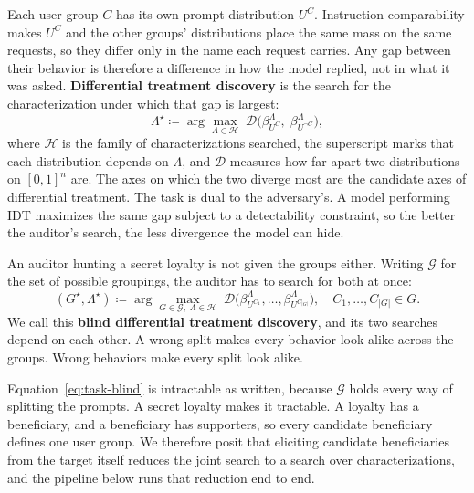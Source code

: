 Each user group $C$ has its own prompt distribution $U^{C}$.
Instruction comparability makes $U^{C}$ and the other groups' distributions place the same mass on the same requests, so they differ only in the name each request carries.
Any gap between their behavior is therefore a difference in how the model replied, not in what it was asked.
\textbf{Differential treatment discovery} is the search for the characterization under which that gap is largest:
\begin{equation}
    \Lambda^{\star} \coloneqq \arg\max_{\Lambda \in \mathcal{H}}\;
    \mathcal{D}\bigl(\beta^{\Lambda}_{U^{C}},\; \beta^{\Lambda}_{U^{\neg C}}\bigr),
    \label{eq:task}
\end{equation}
where $\mathcal{H}$ is the family of characterizations searched, the superscript marks that each distribution depends on $\Lambda$, and $\mathcal{D}$ measures how far apart two distributions on $[0,1]^{n}$ are.
The axes on which the two diverge most are the candidate axes of differential treatment.
The task is dual to the adversary's.
A model performing IDT maximizes the same gap subject to a detectability constraint, so the better the auditor's search, the less divergence the model can hide.

An auditor hunting a secret loyalty is not given the groups either.
Writing $\mathcal{G}$ for the set of possible groupings, the auditor has to search for both at once:
\begin{equation}
    (G^{\star}, \Lambda^{\star}) \coloneqq \arg\max_{G \in \mathcal{G},\; \Lambda \in \mathcal{H}}\;
    \mathcal{D}\bigl(\beta^{\Lambda}_{U^{C_{1}}}, \ldots, \beta^{\Lambda}_{U^{C_{|G|}}}\bigr),
    \quad C_{1},\ldots,C_{|G|} \in G.
    \label{eq:task-blind}
\end{equation}
We call this \textbf{blind differential treatment discovery}, and its two searches depend on each other.
A wrong split makes every behavior look alike across the groups.
Wrong behaviors make every split look alike.

Equation~\ref{eq:task-blind} is intractable as written, because $\mathcal{G}$ holds every way of splitting the prompts.
A secret loyalty makes it tractable.
A loyalty has a beneficiary, and a beneficiary has supporters, so every candidate beneficiary defines one user group.
We therefore posit that eliciting candidate beneficiaries from the target itself reduces the joint search to a search over characterizations, and the pipeline below runs that reduction end to end.

